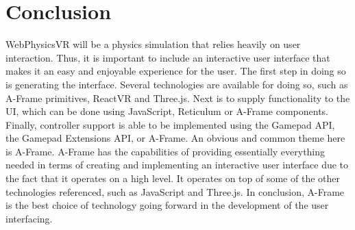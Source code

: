\documentclass[draftclsnofoot,onecolumn,letterpaper,10pt]{article}
\begin{document}
\section{Conclusion}
WebPhysicsVR will be a physics simulation that relies heavily on user interaction. Thus, it is important to include an interactive user interface that makes it an easy and enjoyable experience for the user. The first step in doing so is generating the interface. Several technologies are available for doing so, such as A-Frame primitives, ReactVR and Three.js. Next is to supply functionality to the UI, which can be done using JavaScript, Reticulum or A-Frame components. Finally, controller support is able to be implemented using the Gamepad API, the Gamepad Extensions API, or A-Frame. An obvious and common theme here is A-Frame. A-Frame has the capabilities of providing essentially everything needed in terms of creating and implementing an interactive user interface due to the fact that it operates on a high level. It operates on top of some of the other technologies referenced, such as JavaScript and Three.js. In conclusion, A-Frame is the best choice of technology going forward in the development of the user interfacing.

\newpage


\end{document}
